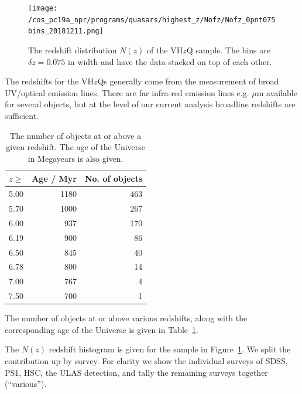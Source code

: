\documentclass[usenatbib]{mnras}
\begin{document}
\begin{figure}
  \texttt{[image: /cos\_pc19a\_npr/programs/quasars/highest\_z/Nofz/Nofz\_0pnt075bins\_20181211.png]}
  \centering
  \vspace{-12pt}
  \caption[]
  {The redshift distribution $N(z)$ of the VH$z$Q sample. 
    The bins are $\delta z=0.075$ in width and have the data 
    stacked on top of each other.}
  \label{fig:Nofz}
\end{figure}

The redshifts for the VH$z$Qs generally come from the measurement of
broad UV/optical emission lines. There are far infra-red emission
lines e.g.  $\mu$m available for several objects, but at the
level of our current analysis broadline redshifts are sufficient.

\begin{table}
\centering
\begin{tabular}{l r  r}
\hline \hline
$z \geq$  & Age / Myr & No. of objects \\
\hline 
5.00         & 1180          &  463   \\
5.70         & 1000          &  267   \\
6.00         &   937          &  170   \\
6.19         &   900          &  86   \\
6.50         &    845         &  40   \\
6.78         &    800         &  14   \\
7.00         &    767         &   4   \\
7.50         &    700         &   1   \\
\hline \hline
\end{tabular}
\caption{The number of objects at or above a given redshift. 
The age of the Universe in Megayears is also given. }
      \label{tab:ages}
\end{table}

The number of objects at or above various redshifts, along with the 
corresponding age of the Universe is given in Table~\ref{tab:ages}. 

The $N(z)$ redshift histogram is given for the sample in Figure~\ref{fig:Nofz}. 
We split the contribution up by survey. For clarity we show the individual 
surveys of SDSS, PS1, HSC, the ULAS detection, and tally the remaining 
surveys together (``various''). 
\end{document}
